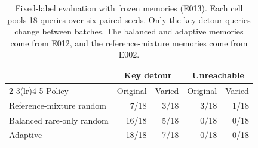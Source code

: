 \begin{table}[H]
\centering
\caption{Fixed-label evaluation with frozen memories (E013). Each cell
pools 18 queries over six paired seeds. Only the key-detour queries change
between batches. The balanced and adaptive memories come from E012,
and the reference-mixture memories come from E002.}
\label{tab:diverse-paths}
\begin{tabular}{lrrrr}
\toprule
& \multicolumn{2}{c}{Key detour} & \multicolumn{2}{c}{Unreachable} \\
\cmidrule(lr){2-3}\cmidrule(lr){4-5}
Policy & Original & Varied & Original & Varied \\
\midrule
Reference-mixture random & 7/18 & 3/18 & 3/18 & 1/18 \\
Balanced rare-only random & 16/18 & 5/18 & 0/18 & 0/18 \\
Adaptive & 18/18 & 7/18 & 0/18 & 0/18 \\
\bottomrule
\end{tabular}
\end{table}
